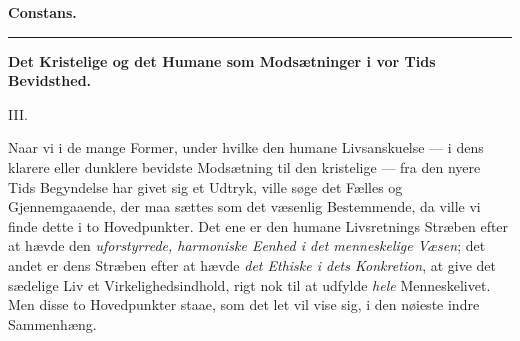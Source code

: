 \documentclass[12pt,a4paper,openany]{book}
\newcommand{\secnum}[1]{\par\begin{center}#1\end{center}\par\nobreak}
\newcommand{\opage}[1]{\marginnote{\footnotesize\textit{[#1]}}}
\begin{document}
\begin{flushright}\textbf{Constans.}\end{flushright}
\begin{center}\rule{2.6cm}{0.4pt}\end{center}

\clearpage
\opage{492}\begin{center}\textbf{\large Det Kristelige og det Humane som Modsætninger i vor Tids Bevidsthed.}\end{center}

\secnum{III.}

Naar vi i de mange Former, under hvilke den humane Livsanskuelse
--- i dens klarere eller dunklere bevidste Modsætning
til den kristelige --- fra den nyere Tids Begyndelse har givet
sig et Udtryk, ville søge det Fælles og Gjennemgaaende, der
maa sættes som det væsenlig Bestemmende, da ville vi finde
dette i to Hovedpunkter. Det ene er den humane Livsretnings
Stræben efter at hævde den \emph{uforstyrrede, harmoniske
Eenhed i det menneskelige Væsen}; det andet er dens
Stræben efter at hævde \emph{det Ethiske i dets Konkretion},
at give det sædelige Liv et Virkelighedsindhold, rigt nok til
at udfylde \emph{hele} Menneskelivet. Men disse to Hovedpunkter
staae, som det let vil vise sig, i den nøieste indre Sammenhæng.
\end{document}
